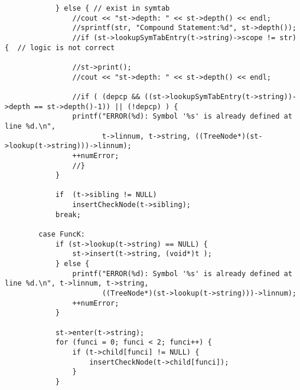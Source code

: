 \documentclass[12pt]{book}
\begin{document}
\begin{lstlisting}
            } else { // exist in symtab
                //cout << "st->depth: " << st->depth() << endl;
                //sprintf(str, "Compound Statement:%d", st->depth());
                //if (st->lookupSymTabEntry(t->string)->scope != str) {  // logic is not correct

                //st->print();
                //cout << "st->depth: " << st->depth() << endl;

                //if ( (depcp && ((st->lookupSymTabEntry(t->string))->depth == st->depth()-1)) || (!depcp) ) {
                printf("ERROR(%d): Symbol '%s' is already defined at line %d.\n", 
                       t->linnum, t->string, ((TreeNode*)(st->lookup(t->string)))->linnum);
                ++numError;
                //}
            }

            if  (t->sibling != NULL)
                insertCheckNode(t->sibling);
            break;

        case FuncK:
            if (st->lookup(t->string) == NULL) {   
                st->insert(t->string, (void*)t ); 
            } else { 
                printf("ERROR(%d): Symbol '%s' is already defined at line %d.\n", t->linnum, t->string, 
                       ((TreeNode*)(st->lookup(t->string)))->linnum);
                ++numError;
            }

            st->enter(t->string);
            for (funci = 0; funci < 2; funci++) {
                if (t->child[funci] != NULL) {
                    insertCheckNode(t->child[funci]);
                }
            }


\end{lstlisting}
\end{document}
